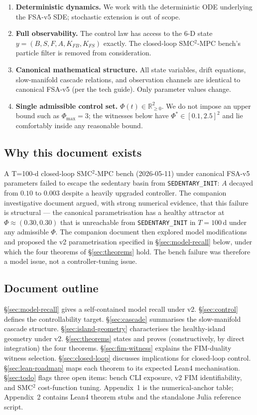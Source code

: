 \documentclass[11pt,a4paper]{article}
\theoremstyle{definition}
\newcommand{\R}{\mathbb{R}}
\begin{document}
\begin{enumerate}
  \item \textbf{Deterministic dynamics.} We work with the deterministic ODE underlying the FSA-v5 SDE; stochastic extension is out of scope.
  \item \textbf{Full observability.} The control law has access to the 6-D state $y = (B, S, F, A, K_{FB}, K_{FS})$ exactly. The closed-loop SMC$^2$-MPC bench's particle filter is removed from consideration.
  \item \textbf{Canonical mathematical structure.} All state variables, drift equations, slow-manifold cascade relations, and observation channels are identical to canonical FSA-v5 (per the tech guide). Only parameter values change.
  \item \textbf{Single admissible control set.} $\Phi(t) \in \R_{\ge 0}^2$. We do not impose an upper bound such as $\Phi_{\max} = 3$; the witnesses below have $\Phi^* \in [0.1, 2.5]^2$ and lie comfortably inside any reasonable bound.
\end{enumerate}

\subsection{Why this document exists}

A T=100-d closed-loop SMC$^2$-MPC bench (2026-05-11) under canonical FSA-v5 parameters failed to escape the sedentary basin from \texttt{SEDENTARY\_INIT}: $A$ decayed from $0.10$ to $0.003$ despite a heavily upgraded controller. The companion investigative document argued, with strong numerical evidence, that this failure is structural — the canonical parametrisation has a healthy attractor at $\Phi \approx (0.30, 0.30)$ that is unreachable from \texttt{SEDENTARY\_INIT} in $T = 100$\,d under any admissible $\Phi$. The companion document then explored model modifications and proposed the v2 parametrisation specified in §\ref{sec:model-recall} below, under which the four theorems of §\ref{sec:theorems} hold. The bench failure was therefore a model issue, not a controller-tuning issue.

\subsection{Document outline}

§\ref{sec:model-recall} gives a self-contained model recall under v2. §\ref{sec:control} defines the controllability target. §\ref{sec:cascade} summarises the slow-manifold cascade structure. §\ref{sec:island-geometry} characterises the healthy-island geometry under v2. §\ref{sec:theorems} states and proves (constructively, by direct integration) the four theorems. §\ref{sec:fim-witness} explains the FIM-duality witness selection. §\ref{sec:closed-loop} discusses implications for closed-loop control. §\ref{sec:lean-roadmap} maps each theorem to its expected Lean4 mechanisation. §\ref{sec:todo} flags three open items: bench CLI exposure, v2 FIM identifiability, and SMC$^2$ cost-function tuning. Appendix~1 is the numerical-anchor table; Appendix~2 contains Lean4 theorem stubs and the standalone Julia reference script.
\end{document}

